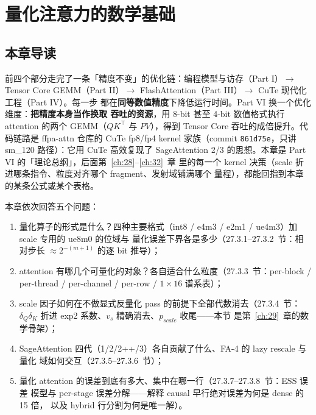 \chapter{量化注意力的数学基础}\label{ch:27}

\section{本章导读}

前四个部分走完了一条「精度不变」的优化链：编程模型与访存（Part I）$\to$ Tensor Core
GEMM（Part II）$\to$ FlashAttention（Part III）$\to$ CuTe 现代化工程（Part IV）。每一步
都在\textbf{同等数值精度}下降低运行时间。Part VI 换一个优化维度：\textbf{把精度本身当作换取
吞吐的资源}，用 8-bit 甚至 4-bit 数值格式执行 attention 的两个 GEMM（$QK^{\top}$ 与
$PV$），得到 Tensor Core 吞吐的成倍提升。代码链路是 ffpa-attn 仓库的 CuTe fp8/fp4 kernel
家族（commit \texttt{861d75e}，只讲 sm\_120 路径）：它用 CuTe 高效复现了 SageAttention
2/3 的思想。本章是 Part VI 的「理论总纲」，后面第~\ref{ch:28}--\ref{ch:32}~章
里的每一个 kernel 决策（scale 折进哪条指令、粒度对齐哪个 fragment、发射域铺满哪个
量程），都能回指到本章的某条公式或某个表格。

本章依次回答五个问题：
\begin{enumerate}[itemsep=0pt,topsep=2pt]
  \item 量化算子的形式是什么？四种主要格式（int8 / e4m3 / e2m1 / ue4m3）加 scale
        专用的 ue8m0 的位域与
        量化误差下界各是多少（27.3.1--27.3.2~节：相对步长
        $\approx 2^{-(m+1)}$ 的逐 bit 推导）；
  \item attention 有哪几个可量化的对象？各自适合什么粒度（27.3.3~节：per-block /
        per-thread / per-channel / per-row / $1\times16$ 谱系表）；
  \item scale 因子如何在不做显式反量化 pass 的前提下全部代数消去（27.3.4~节：
        $\delta_Q\delta_K$ 折进 exp2 系数、$v_s$ 精确消去、$p_{scale}$ 收尾——本节
        是第~\ref{ch:29}~章的数学骨架）；
  \item SageAttention 四代（1/2/2++/3）各自贡献了什么、FA-4 的 lazy rescale 与量化
        域如何交互（27.3.5--27.3.6~节）；
  \item 量化 attention 的误差到底有多大、集中在哪一行（27.3.7--27.3.8~节：ESS 误差
        模型与 per-stage 误差分解——解释 causal 早行绝对误差为何是 dense 的 15 倍，
        以及 hybrid 行分割为何是唯一解）。
\end{enumerate}

